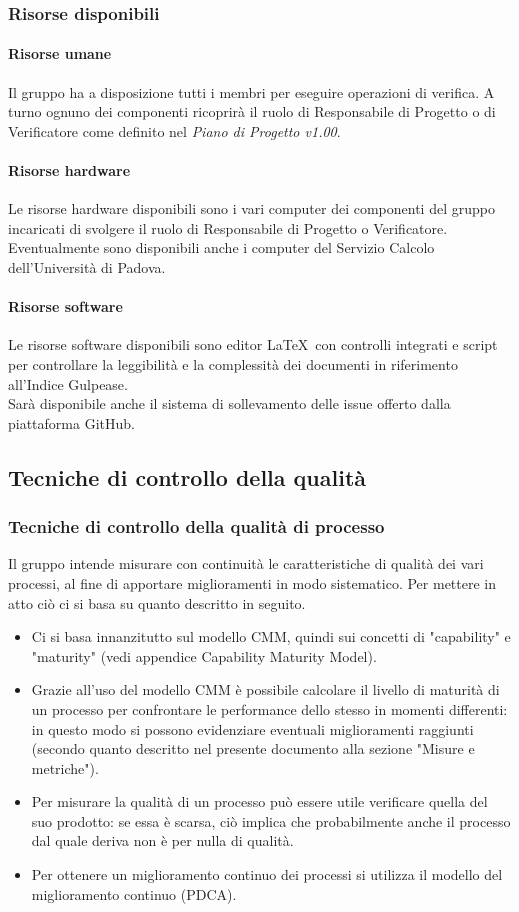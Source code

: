 \documentclass[../PianoDiQualifica.tex]{subfiles}
\begin{document}
		    \subsubsection{Risorse disponibili}
			    \paragraph{Risorse umane}
			    Il gruppo ha a disposizione tutti i membri per eseguire operazioni di verifica. A turno ognuno dei componenti ricoprirà il ruolo di Responsabile di Progetto o di Verificatore come definito nel \textit{Piano di Progetto v1.00}.
			    \paragraph{Risorse hardware}
			    Le risorse hardware disponibili sono i vari computer dei componenti del gruppo incaricati di svolgere il ruolo di Responsabile di Progetto o Verificatore. Eventualmente sono disponibili anche i computer del Servizio Calcolo dell'Università di Padova.
				\paragraph{Risorse software}
				Le risorse software disponibili sono editor \LaTeX \ con controlli integrati e script per controllare la leggibilità e la complessità dei documenti in riferimento all'Indice Gulpease.\\
				Sarà disponibile anche il sistema di sollevamento delle issue offerto dalla piattaforma GitHub.
		\subsection{Tecniche di controllo della qualità}
			\subsubsection{Tecniche di controllo della qualità di processo}
			Il gruppo intende misurare con continuità le caratteristiche di qualità dei vari processi, al fine di apportare miglioramenti in modo sistematico. Per mettere in atto ciò ci si basa su quanto descritto in seguito.
			\begin{itemize}
				\item Ci si basa innanzitutto sul modello CMM, quindi sui concetti di "capability" e "maturity" (vedi appendice Capability Maturity Model).
				\item Grazie all'uso del modello CMM è possibile calcolare il livello di maturità di un processo per confrontare le performance dello stesso in momenti differenti: in questo modo si possono evidenziare eventuali miglioramenti raggiunti (secondo quanto descritto nel presente documento alla sezione "Misure e metriche").
				\item Per misurare la qualità di un processo può essere utile verificare quella del suo prodotto: se essa è scarsa, ciò implica che probabilmente anche il processo dal quale deriva non è per nulla di qualità.
				\item Per ottenere un miglioramento continuo dei processi si utilizza il modello del miglioramento continuo (PDCA).
			\end{itemize}
\end{document}
